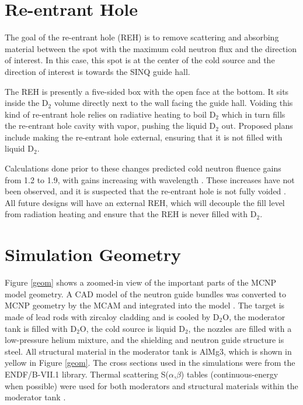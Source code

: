 \documentclass[a4paper]{jpconf}
\begin{document}
\section{Re-entrant Hole}

The goal of the re-entrant hole (REH) is to remove scattering and absorbing material between the spot with the maximum cold neutron flux and the direction of interest.  In this case, this spot is at the center of the cold source and the direction of interest is towards the SINQ guide hall.  

The REH is presently a five-sided box with the open face at the bottom.  It sits inside the D$_2$ volume directly next to the wall facing the guide hall.  Voiding this kind of re-entrant hole relies on radiative heating to boil D$_2$ which in turn fills the re-entrant hole cavity with vapor, pushing the liquid D$_2$ out.  Proposed plans include making the re-entrant hole external, ensuring that it is not filled with liquid D$_2$.

Calculations done prior to these changes predicted cold neutron fluence gains from 1.2 to 1.9, with gains increasing with wavelength \cite{atch_icans}. These increases have not been observed, and it is suspected that the re-entrant hole is not fully voided \cite{voided}.  All future designs will have an external REH, which will decouple the fill level from radiation heating and ensure that the REH is never filled with D$_2$.

\section{Simulation Geometry}

Figure \ref{geom} shows a zoomed-in view of the important parts of the MCNP model geometry.  A CAD model of the neutron guide bundles was converted to MCNP geometry by the MCAM and integrated into the model \cite{mcam}.  The target is made of lead rods with zircaloy cladding and is cooled by D$_2$O, the moderator tank is filled with D$_2$O, the cold source is liquid D$_2$, the nozzles are filled with a low-pressure helium mixture, and the shielding and neutron guide structure is steel.  All structural material in the moderator tank is AlMg3, which is shown in yellow in Figure \ref{geom}.  The cross sections used in the simulations were from the ENDF/B-VII.1 library.  Thermal scattering S($\alpha$,$\beta$) tables (continuous-energy when possible) were used for both moderators and structural materials within the moderator tank \cite{sab}.
\end{document}
